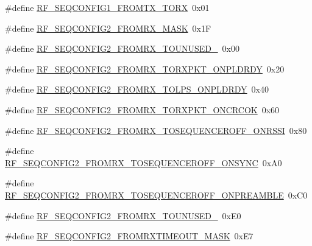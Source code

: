 \begin{DoxyCompactItemize}
\#define \hyperlink{sx1276Regs-Fsk_8h_a8af68d94c1ffd6f3cf982a475f07208e}{R\+F\+\_\+\+S\+E\+Q\+C\+O\+N\+F\+I\+G1\+\_\+\+F\+R\+O\+M\+T\+X\+\_\+\+T\+O\+RX}~0x01
\item 
\#define \hyperlink{sx1276Regs-Fsk_8h_a297c55a1f13050a1b8b4a9656dee1bee}{R\+F\+\_\+\+S\+E\+Q\+C\+O\+N\+F\+I\+G2\+\_\+\+F\+R\+O\+M\+R\+X\+\_\+\+M\+A\+SK}~0x1F
\item 
\#define \hyperlink{sx1276Regs-Fsk_8h_adafa898afe4ea546849d24b47fab63e9}{R\+F\+\_\+\+S\+E\+Q\+C\+O\+N\+F\+I\+G2\+\_\+\+F\+R\+O\+M\+R\+X\+\_\+\+T\+O\+U\+N\+U\+S\+E\+D\+\_}~0x00
\item 
\#define \hyperlink{sx1276Regs-Fsk_8h_ae7a4ee5cace860cabada5e5696f0d2f4}{R\+F\+\_\+\+S\+E\+Q\+C\+O\+N\+F\+I\+G2\+\_\+\+F\+R\+O\+M\+R\+X\+\_\+\+T\+O\+R\+X\+P\+K\+T\+\_\+\+O\+N\+P\+L\+D\+R\+DY}~0x20
\item 
\#define \hyperlink{sx1276Regs-Fsk_8h_a39d97dcfbbf843fa3ed39b8684382fc2}{R\+F\+\_\+\+S\+E\+Q\+C\+O\+N\+F\+I\+G2\+\_\+\+F\+R\+O\+M\+R\+X\+\_\+\+T\+O\+L\+P\+S\+\_\+\+O\+N\+P\+L\+D\+R\+DY}~0x40
\item 
\#define \hyperlink{sx1276Regs-Fsk_8h_a15da62d2433f1464b5ed139af3bf2f43}{R\+F\+\_\+\+S\+E\+Q\+C\+O\+N\+F\+I\+G2\+\_\+\+F\+R\+O\+M\+R\+X\+\_\+\+T\+O\+R\+X\+P\+K\+T\+\_\+\+O\+N\+C\+R\+C\+OK}~0x60
\item 
\#define \hyperlink{sx1276Regs-Fsk_8h_a8da00c89f8cbc3168a1eef6440c76427}{R\+F\+\_\+\+S\+E\+Q\+C\+O\+N\+F\+I\+G2\+\_\+\+F\+R\+O\+M\+R\+X\+\_\+\+T\+O\+S\+E\+Q\+U\+E\+N\+C\+E\+R\+O\+F\+F\+\_\+\+O\+N\+R\+S\+SI}~0x80
\item 
\#define \hyperlink{sx1276Regs-Fsk_8h_a1d5b9abdda18dcf97144ee55420e9c63}{R\+F\+\_\+\+S\+E\+Q\+C\+O\+N\+F\+I\+G2\+\_\+\+F\+R\+O\+M\+R\+X\+\_\+\+T\+O\+S\+E\+Q\+U\+E\+N\+C\+E\+R\+O\+F\+F\+\_\+\+O\+N\+S\+Y\+NC}~0x\+A0
\item 
\#define \hyperlink{sx1276Regs-Fsk_8h_ad291c261a95d9171798bf2b564d1ac9c}{R\+F\+\_\+\+S\+E\+Q\+C\+O\+N\+F\+I\+G2\+\_\+\+F\+R\+O\+M\+R\+X\+\_\+\+T\+O\+S\+E\+Q\+U\+E\+N\+C\+E\+R\+O\+F\+F\+\_\+\+O\+N\+P\+R\+E\+A\+M\+B\+LE}~0x\+C0
\item 
\#define \hyperlink{sx1276Regs-Fsk_8h_a189edf62f7c74b86afb5d840272ed540}{R\+F\+\_\+\+S\+E\+Q\+C\+O\+N\+F\+I\+G2\+\_\+\+F\+R\+O\+M\+R\+X\+\_\+\+T\+O\+U\+N\+U\+S\+E\+D\+\_}~0x\+E0
\item 
\#define \hyperlink{sx1276Regs-Fsk_8h_a3d4b2324c35b3440327ddc622e57b54f}{R\+F\+\_\+\+S\+E\+Q\+C\+O\+N\+F\+I\+G2\+\_\+\+F\+R\+O\+M\+R\+X\+T\+I\+M\+E\+O\+U\+T\+\_\+\+M\+A\+SK}~0x\+E7
\item 

\end{DoxyCompactItemize}
